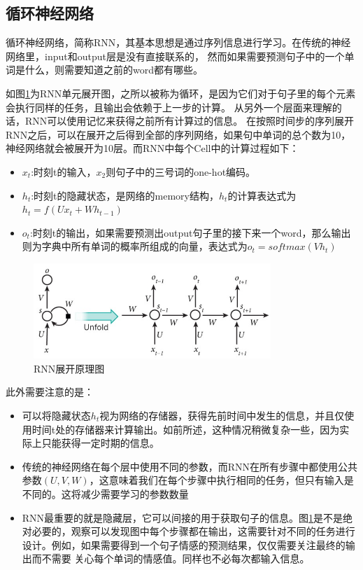 \documentclass[supercite]{HustGraduPaper}
\theoremstyle{definition}
\begin{document}
\subsection{循环神经网络}
循环神经网络，简称RNN\cite{mikolov2010recurrent}，其基本思想是通过序列信息进行学习。在传统的神经网络里，input和output层是没有直接联系的，
然而如果需要预测句子中的一个单词是什么，则需要知道之前的word都有哪些。

如图\ref{Fig.rnn}为RNN单元展开图，之所以被称为循环，是因为它们对于句子里的每个元素会执行同样的任务，且输出会依赖于上一步的计算。
从另外一个层面来理解的话，RNN可以使用记忆来获得之前所有计算过的信息。
在按照时间步的序列展开RNN之后，可以在展开之后得到全部的序列网络，如果句中单词的总个数为10，神经网络就会被展开为10层。而RNN中每个Cell中的计算过程如下：

\begin{itemize}
  \item $x_t$:时刻t的输入，$x_2$则句子中的三号词的one-hot编码。
  \item $h_t$:时刻t的隐藏状态，是网络的memory结构，$h_t$的计算表达式为$h_t=f(Ux_t + Wh_{t-1})$
  \item $o_t$:时刻t的输出，如果需要预测出output句子里的接下来一个word，那么输出则为字典中所有单词的概率所组成的向量，表达式为$o_t = softmax(Vh_t)$
\end{itemize}

\begin{figure}[htbp] %
  \centering %
  \includegraphics[width=0.8\textwidth]{images/rnn.png} %
  \caption{RNN展开原理图} %
  \label{Fig.rnn} %
\end{figure}

此外需要注意的是：
\begin{itemize}
  \item 可以将隐藏状态$h_t$视为网络的存储器，获得先前时间中发生的信息，并且仅使用时间t处的存储器来计算输出。如前所述，这种情况稍微复杂一些，因为实际上只能获得一定时期的信息。
  \item 传统的神经网络在每个层中使用不同的参数，而RNN在所有步骤中都使用公共参数$(U,V,W)$，这意味着我们在每个步骤中执行相同的任务，但只有输入是不同的。这将减少需要学习的参数数量
  \item RNN最重要的就是隐藏层，它可以间接的用于获取句子的信息。图\ref{Fig.rnn}是不是绝对必要的，观察可以发现图中每个步骤都在输出，这需要针对不同的任务进行设计。例如，如果需要得到一个句子情感的预测结果，仅仅需要关注最终的输出而不需要
  关心每个单词的情感值。同样也不必每次都输入信息。
\end{itemize}
\end{document}
